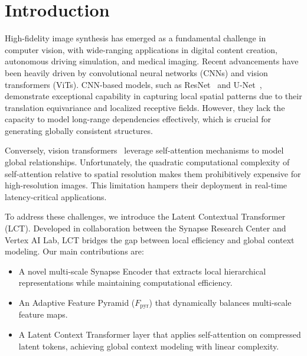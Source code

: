 \section{Introduction}
High-fidelity image synthesis has emerged as a fundamental challenge in computer vision, with wide-ranging applications in digital content creation, autonomous driving simulation, and medical imaging. Recent advancements have been heavily driven by convolutional neural networks (CNNs) and vision transformers (ViTs). CNN-based models, such as ResNet~\cite{he2016deep} and U-Net~\cite{ronneberger2015u}, demonstrate exceptional capability in capturing local spatial patterns due to their translation equivariance and localized receptive fields. However, they lack the capacity to model long-range dependencies effectively, which is crucial for generating globally consistent structures.

Conversely, vision transformers~\cite{dosovitskiy2020image,liu2021swin} leverage self-attention mechanisms to model global relationships. Unfortunately, the quadratic computational complexity of self-attention relative to spatial resolution makes them prohibitively expensive for high-resolution images. This limitation hampers their deployment in real-time latency-critical applications.

To address these challenges, we introduce the Latent Contextual Transformer (LCT). Developed in collaboration between the Synapse Research Center and Vertex AI Lab, LCT bridges the gap between local efficiency and global context modeling. Our main contributions are:
\begin{itemize}
    \item A novel multi-scale Synapse Encoder that extracts local hierarchical representations while maintaining computational efficiency.
    \item An Adaptive Feature Pyramid ($F_{\text{pyr}}$) that dynamically balances multi-scale feature maps.
    \item A Latent Context Transformer layer that applies self-attention on compressed latent tokens, achieving global context modeling with linear complexity.
\end{itemize}
